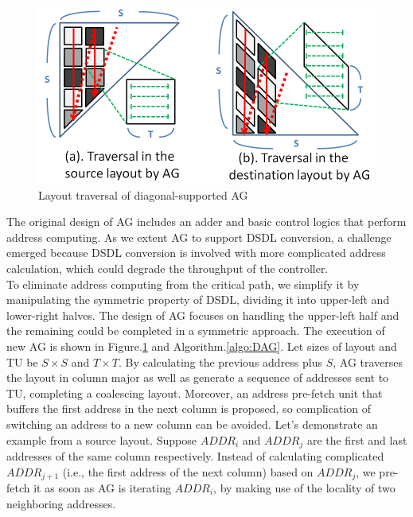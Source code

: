 \documentclass[10pt,journal,compsoc]{IEEEtran}
\begin{document}
\begin{figure}[t]
\begin{center}
\graphicspath{{picture/}}

\includegraphics[scale=0.32]{agnew}

\caption{Layout traversal of diagonal-supported AG}
\label{fig:Diagonal_AG}
\end{center}
\end{figure}


 The original design of AG includes an adder and basic control logics that perform address computing. As we extent AG to support DSDL conversion, a challenge emerged because DSDL conversion is involved with more complicated address calculation, which could degrade the throughput of the controller. \\
 \indent To eliminate address computing from the critical path, we simplify it by manipulating the symmetric property of DSDL, dividing it into upper-left and lower-right halves. The design of AG focuses on handling the upper-left half and the remaining could be completed in a symmetric approach. The execution of new AG is shown in Figure.\ref{fig:Diagonal_AG} and Algorithm.\ref{algo:DAG}. Let sizes of layout and TU be $S\times S$ and $T\times T$. By calculating the previous address plus $S$, AG traverses the layout in column major as well as generate a sequence of addresses sent to TU, completing a coalescing layout. Moreover, an address pre-fetch unit that buffers the first address in the next column is proposed, so complication of switching an address to a new column can be avoided. Let's demonstrate an example from a source layout. Suppose ${ADDR}_{i}$ and ${ADDR}_{j}$ are the first and last addresses of the same column respectively. Instead of calculating complicated ${ADDR}_{j+1}$ (i.e., the first address of the next column) based on ${ADDR}_{j}$, we pre-fetch it as soon as AG is iterating ${ADDR}_{i}$, by making use of the locality of two neighboring addresses.
\end{document}
